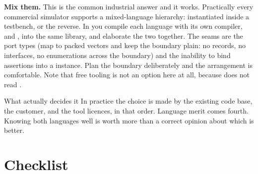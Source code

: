 \textbf{Mix them.} This is the common industrial answer and it works.
Practically every commercial simulator supports a mixed-language hierarchy:
\VHDL{} \RTL{} instantiated inside a \SV{} testbench, or the reverse. In
 you compile each language with its own compiler,
 and , into the same library, and elaborate
the two together. The seams are the port types (map
 to packed vectors and keep the boundary plain: no
records, no interfaces, no enumerations across the boundary) and the inability
to bind \SV{} assertions into a \VHDL{} instance. Plan the boundary
deliberately and the arrangement is comfortable. Note that free tooling is not
an option here at all, because  does not read \VHDL{}.

\begin{notebox}{What actually decides it}
In practice the choice is made by the existing code base, the customer, and
the tool licences, in that order. Language merit comes fourth. Knowing both
languages well is worth more than a correct opinion about which is better.
\end{notebox}


\section{Checklist}
\label{sec:philosophy:checklist}

